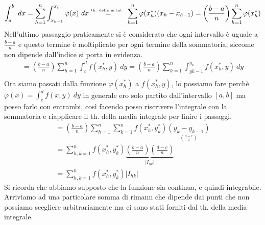 \documentclass[a4paper, oneside]{article}
\begin{document}
\begin{gather*}
    \int_{a}^{b} \ dx = \sum_{h=1}^{n} \int_{x_{h-1}}^{x_h} \varphi(x) \ dx \overset{\text{\tiny th. della m int. \normalsize}}{=} \sum_{h=1}^{n} \varphi(x_h^*) (x_h - x_{h-1}) = \left(\frac{b-a}{n}\right) \sum_{h=1}^{n} \varphi(x_h^*)\\
\end{gather*}
Nell'ultimo passaggio praticamente si è considerato che ogni intervallo è uguale a $\frac{b-a}{n}$ e questo termine è moltiplicato per ogni termine della sommatoria, siccome non dipende dall'indice si porta   in evidenza.
\begin{gather*}
    = \left(\frac{b-a}{n}\right) \sum_{h=1}^{n} \int_{c}^{d} f(x_h^* , y) \ dy = \left(\frac{b-a}{n}\right) \sum_{k=1}^{n} \int_{y{k-1}}^{y_k} f(x_h^*,y) \ dy\\
\end{gather*}
Ora siamo passati dalla funzione $\varphi(x^*_h)$ a $f(x^*_h,y)$, lo possiamo fare perchè $\varphi(x) = \int_{c}^{d} f(x,y) \ dy$ in generale ero solo partito dall'intervallo $[a,b]$ ma posso farlo con entrambi, così facendo posso riscrivere l'integrale con la sommatoria e riapplicare il th. della media integrale per finire i passaggi.
\begin{gather*}
    = \left(\frac{b-a}{n}\right) \sum_{h=1}^{n} \sum_{k=1}^{n} f(x_h^*,y_k^*) \underset{\left(\frac{d-c}{n}\right)}{\left(y_k - y_{k-1}\right) } \\
    = \sum_{h,k = 1}^{n} f(x_h^*,y_k^*) \underbrace{\left(\frac{b-a}{n}\right)\left(\frac{d-c}{n}\right)}_{\left\lvert I_{hk} \right\rvert }\\
    = \sum_{h,k=1}^n f(x_h^*,y_k^*) |I_{hk}| 
    \end{gather*}
Si ricorda che abbiamo supposto che la funzione sia continua, e quindi integrabile. Arriviamo ad una particolare somma di rimann che dipende dai punti che non possiamo scegliere arbitrariamente ma ci sono stati forniti dal th. della media integrale.\\
\end{document}
